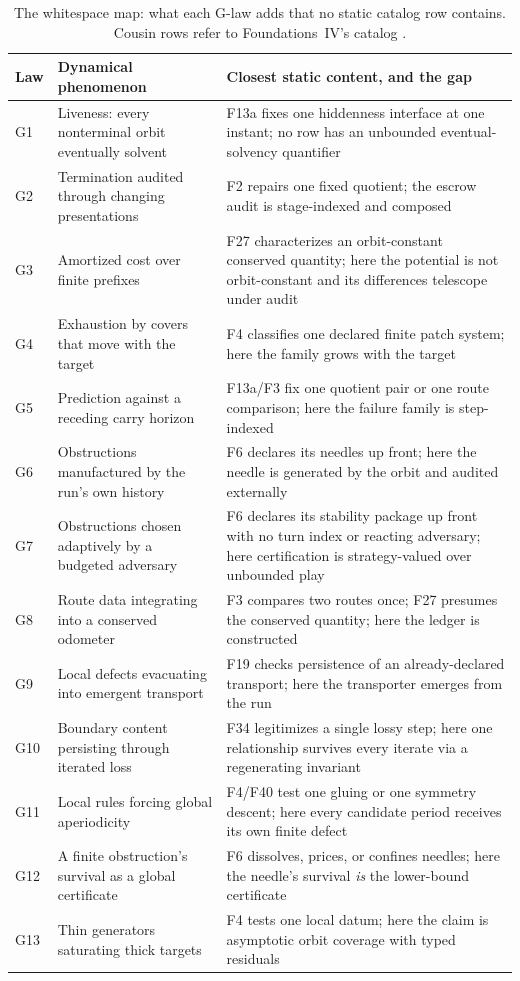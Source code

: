 \documentclass[11pt]{article}
\newcommand{\FoundIV}{Foundations~IV}
\theoremstyle{definition}
\begin{document}
\begin{table}[htbp]
\caption{The whitespace map: what each G-law adds that no static catalog row contains. Cousin rows
refer to \FoundIV's catalog \citep{Tsiokos2026FoundIV}.}
\label{tab:whitespace}
\footnotesize
\begin{tabularx}{\textwidth}{@{}lXX@{}}
\toprule
Law & Dynamical phenomenon & Closest static content, and the gap \\
\midrule
G1 & Liveness: every nonterminal orbit eventually solvent & F13a fixes one hiddenness interface at
one instant; no row has an unbounded eventual-solvency quantifier \\
G2 & Termination audited through changing presentations & F2 repairs one fixed quotient; the escrow
audit is stage-indexed and composed \\
G3 & Amortized cost over finite prefixes & F27 characterizes an orbit-constant conserved
quantity; here the potential is not orbit-constant and its differences telescope under audit \\
G4 & Exhaustion by covers that move with the target & F4 classifies one declared finite patch
system; here the family grows with the target \\
G5 & Prediction against a receding carry horizon & F13a/F3 fix one quotient pair or one route
comparison; here the failure family is step-indexed \\
G6 & Obstructions manufactured by the run's own history & F6 declares its needles up front; here the
needle is generated by the orbit and audited externally \\
G7 & Obstructions chosen adaptively by a budgeted adversary & F6 declares its stability package
up front with no turn index or reacting adversary; here certification is strategy-valued over
unbounded play \\
G8 & Route data integrating into a conserved odometer & F3 compares two routes once; F27 presumes
the conserved quantity; here the ledger is constructed \\
G9 & Local defects evacuating into emergent transport & F19 checks persistence of an
already-declared transport; here the transporter emerges from the run \\
G10 & Boundary content persisting through iterated loss & F34 legitimizes a single lossy step; here
one relationship survives every iterate via a regenerating invariant \\
G11 & Local rules forcing global aperiodicity & F4/F40 test one gluing or one symmetry descent; here
every candidate period receives its own finite defect \\
G12 & A finite obstruction's survival as a global certificate & F6 dissolves, prices, or confines
needles; here the needle's survival \emph{is} the lower-bound certificate \\
G13 & Thin generators saturating thick targets & F4 tests one local datum; here the claim is
asymptotic orbit coverage with typed residuals \\
\bottomrule
\end{tabularx}
\end{table}
\end{document}
